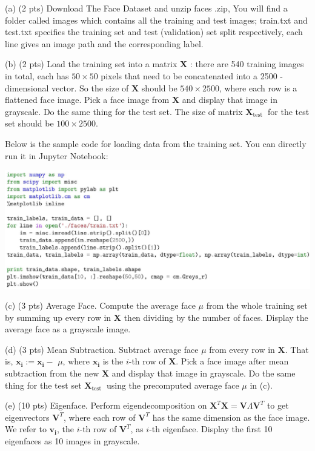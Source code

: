 \documentclass[10pt]{article}
\begin{document}
(a) (2 pts) Download The Face Dataset and unzip faces .zip, You will find a folder called images which contains all the training and test images; train.txt and test.txt specifies the training set and test (validation) set split respectively, each line gives an image path and the corresponding label.

(b) (2 pts) Load the training set into a matrix $\mathbf{X}$ : there are 540 training images in total, each has $50 \times 50$ pixels that need to be concatenated into a 2500 -dimensional vector. So the size of $\mathbf{X}$ should be $540 \times 2500$, where each row is a flattened face image. Pick a face image from $\mathbf{X}$ and display that image in grayscale. Do the same thing for the test set. The size of matrix $\mathbf{X}_{\text {test }}$ for the test set should be $100 \times 2500$.

Below is the sample code for loading data from the training set. You can directly run it in Jupyter Notebook:

\begin{center}
\includegraphics[max width=\textwidth]{2023_10_15_797733af37a95ba2c0b6g-2}
\end{center}

(c) (3 pts) Average Face. Compute the average face $\mu$ from the whole training set by summing up every row in $\mathbf{X}$ then dividing by the number of faces. Display the average face as a grayscale image.

(d) (3 pts) Mean Subtraction. Subtract average face $\mu$ from every row in $\mathbf{X}$. That is, $\mathbf{x}_{\mathbf{i}}:=\mathbf{x}_{\mathbf{i}}-$ $\mu$, where $\mathbf{x}_{\mathbf{i}}$ is the $i$-th row of $\mathbf{X}$. Pick a face image after mean subtraction from the new $\mathbf{X}$ and display that image in grayscale. Do the same thing for the test set $\mathbf{X}_{\text {test }}$ using the precomputed average face $\mu$ in (c).

(e) (10 pts) Eigenface. Perform eigendecomposition on $\mathbf{X}^{T} \mathbf{X}=\mathbf{V} \Lambda \mathbf{V}^{T}$ to get eigenvectors $\mathbf{V}^{T}$, where each row of $\mathbf{V}^{T}$ has the same dimension as the face image. We refer to $\mathbf{v}_{\mathbf{i}}$, the $i$-th row of $\mathbf{V}^{T}$, as $i$-th eigenface. Display the first 10 eigenfaces as 10 images in grayscale.
\end{document}

